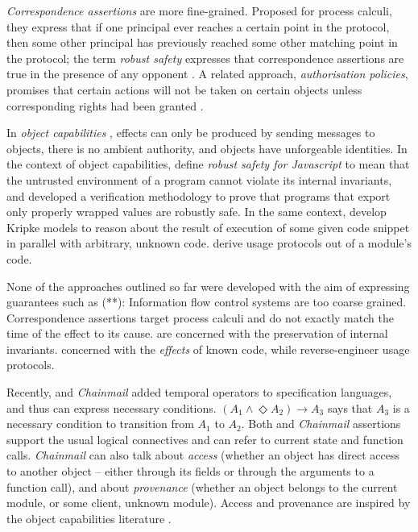 \emph{Correspondence assertions} are more fine-grained. Proposed for 
process calculi, they %
{express}  that if one principal ever reaches a certain point in the protocol, 
then some other principal has previously reached some other matching point in the protocol; 
the term \emph{robust safety}  expresses that correspondence assertions are true in the presence of any opponent %
\cite{correspondence}. 
A related approach,  \emph{authorisation policies}, 
promises that certain actions will not be taken on certain objects
unless corresponding  rights had been granted  \cite{Maffeis:aiamb:thesis00}.

In   \emph{object capabilities} \cite{MillerPhD},
effects can only be produced by sending messages to objects,  there
is no ambient authority, and  objects 
have unforgeable identities.
In the context of object capabilities, \citeauthor{ddd} define  \emph{robust safety for Javascript}  
to mean that the untrusted environment of a program cannot violate 
its internal invariants, and developed  a verification methodology   to 
prove   that programs that  export only properly wrapped values  are robustly safe.
In the same context, \citeauthor{dd} develop Kripke models to reason about 
the result of execution of some given code snippet in parallel
with arbitrary, unknown code.  
 \cite{threoremsFreeSep} derive usage protocols out of a module's code.

{None} of the approaches outlined so far were developed with
 the aim of expressing guarantees such as (**):  
  Information flow control systems are too
 coarse grained. Correspondence assertions target process calculi and do not exactly match 
 the time of the effect to its cause. \citeauthor{ddd} are concerned with the preservation of
 internal invariants. \citeauthor{dd}   
 concerned with the \emph{effects} of known code,
 while \cite{threoremsFreeSep}  reverse-engineer usage protocols.
 
Recently,  {}  \cite{VerX}  and   \emph{Chainmail}  \cite{FASE} 
 added temporal operators to specification languages, and thus can express necessary conditions.  
 $(A_1 \wedge \Diamond A_2) \longrightarrow A_3$ says that  $A_3$ is a necessary condition to
 transition from $A_1$ to $A_2$.
 Both  {}  and   \emph{Chainmail} assertions support the usual 
   logical connectives and can refer to current state and function calls.
 \emph{Chainmail} 
 can also talk about \emph{access} (whether an
 object has direct access to another object -- either through its fields or 
 through the arguments to a function call),  and about \emph{provenance} (whether an object
 belongs to the current module, or some client, unknown module).
Access and provenance are inspired by the object capabilities
 literature \cite{MillerPhD}. 
 
